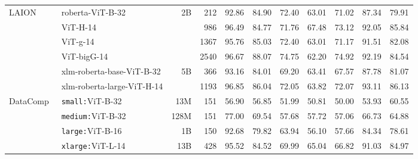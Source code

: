 \begin{table}[t]
{\begin{tabular}{llrr ccccccc}
\midrule

\multirow{6}{*}{LAION~\cite{laion5b}}   
& roberta-ViT-B-32& \multirow{4}{*}{2B}& 212& 92.86& 84.90& 72.40& 63.01& 71.02& 87.34& 79.91\\
& ViT-H-14&  & 986& 96.49& 84.77& 71.76& 67.48& 73.12& 92.05& 85.84\\
& ViT-g-14& & 1367& 95.76& 85.03& 72.40& 63.01& 71.17& 91.51& 82.08\\
& ViT-bigG-14& & 2540& 96.67& 88.07& 74.75& 62.20& 74.92& 92.19& 84.54\\ \cline{3-3}
& xlm-roberta-base-ViT-B-32& \multirow{2}{*}{5B}& 366& 93.16& 84.01& 69.20& 63.41& 67.57& 87.78& 81.07\\
& xlm-roberta-large-ViT-H-14& & 1193& 96.85& 86.04& 72.05& 63.82& 72.07& 93.11& 86.13\\


\midrule

\multirow{4}{*}{DataComp~\cite{gadre2023datacomp}}   
& \texttt{small:}ViT-B-32& 13M& 151& 56.90& 56.85& 51.99& 50.81& 50.00& 53.93& 60.55\\
& \texttt{medium:}ViT-B-32& 128M& 151 & 77.00& 69.54& 57.68& 57.72& 57.06& 66.73& 64.88\\
& \texttt{large:}ViT-B-16& 1B& 150& 92.68& 79.82& 63.94& 56.10& 57.66& 84.34& 78.61\\
& \texttt{xlarge:}ViT-L-14& 13B& 428& 95.52& 84.52& 69.99& 65.04& 66.82& 91.03& 84.97\\

\bottomrule 
\end{tabular}
}
  
  \label{tab:eval_ours}

\end{table}